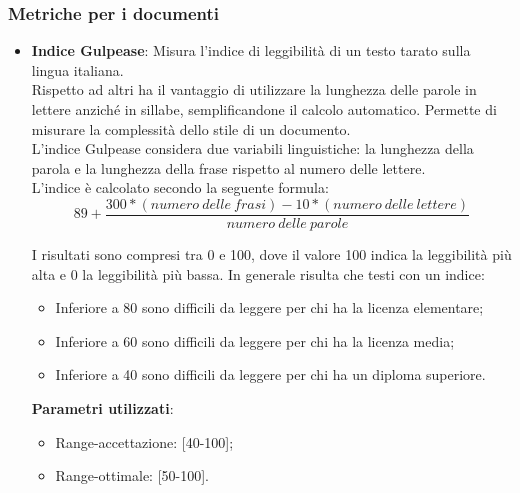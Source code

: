 \subsubsection{Metriche per i documenti}
\label{sec:metricadocumenti}
\begin{itemize}
\item \textbf{Indice Gulpease}: Misura l'indice di leggibilità di un testo tarato sulla lingua italiana.\\
Rispetto ad altri ha il vantaggio di utilizzare la lunghezza delle parole in lettere anziché in sillabe, semplificandone il calcolo automatico. Permette di misurare la complessità dello stile di un documento.\\
L'indice Gulpease considera due variabili linguistiche: la lunghezza della parola e la lunghezza della frase rispetto al numero delle lettere.\\
L'indice è calcolato secondo la seguente formula:\\


\[89 + \frac{300 *(numero\ delle\ frasi) -10 *(numero\ delle\ lettere)}{numero\ delle\ parole}\]

I risultati sono compresi tra 0 e 100, dove il valore 100 indica la leggibilità più alta e 0 la leggibilità più bassa. In generale risulta che testi con un indice:

\begin{itemize}
\item Inferiore a 80 sono difficili da leggere per chi ha la licenza elementare;
\item Inferiore a 60 sono difficili da leggere per chi ha la licenza media;
\item Inferiore a 40 sono difficili da leggere per chi ha un diploma superiore.
\end{itemize}

\textbf{Parametri utilizzati}:
\begin{itemize}
\item Range-accettazione: [40-100];
\item Range-ottimale: [50-100].
\end{itemize}
\end{itemize}